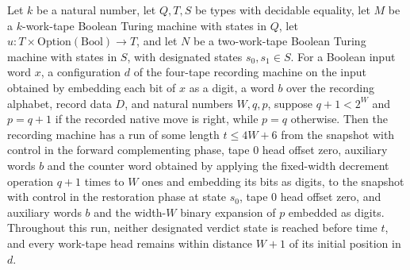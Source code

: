\begin{theorem}
\label{Turing.recordStep_restore_digits}
\leanok
{}
Let $k$ be a natural number, let $Q,T,S$ be types with decidable equality, let $M$ be a
$k$-work-tape Boolean Turing machine with states in $Q$, let
$u:T\times\mathrm{Option}(\mathrm{Bool})\to T$, and let $N$ be a two-work-tape Boolean
Turing machine with states in $S$, with designated states $s_0,s_1\in S$. For a Boolean
input word $x$, a configuration $d$ of the four-tape recording machine on the input
obtained by embedding each bit of $x$ as a digit, a word $b$ over the recording
alphabet, record data $D$, and natural numbers $W,q,p$, suppose $q+1<2^W$ and $p=q+1$ if
the recorded native move is right, while $p=q$ otherwise. Then the recording machine has
a run of some length $t\le 4W+6$ from the snapshot with control in the forward
complementing phase, tape 0 head offset zero, auxiliary words $b$ and the counter word
obtained by applying the fixed-width decrement operation $q+1$ times to $W$ ones and
embedding its bits as digits, to the snapshot with control in the restoration phase at
state $s_0$, tape 0 head offset zero, and auxiliary words $b$ and the width-$W$ binary
expansion of $p$ embedded as digits. Throughout this run, neither designated verdict
state is reached before time $t$, and every work-tape head remains within distance $W+1$
of its initial position in $d$.
\end{theorem}

